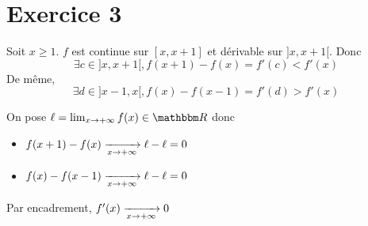 \part{Exercice 3}

Soit $x \ge 1$. $f$ est continue sur $[x, x+1]$ et dérivable sur $]x,x+1[$. Donc \[
	\exists c \in]x,x+1[, f(x+1)-f(x) = f'(c) < f'(x)
\] 
De même, \[
	\exists d \in ]x-1,x[, f(x) - f(x-1) = f'(d) > f'(x)
\] 

On pose $\ell = \lim_{x\to +\infty} f(x) \in \R$ donc 
\begin{itemize}
	\item $f(x+1)-f(x) \xrightarrow[x\to +\infty]{} \ell - \ell = 0$
	\item $f(x)-f(x-1) \xrightarrow[x\to +\infty]{} \ell - \ell = 0$
\end{itemize}

Par encadrement, $f'(x) \xrightarrow[x\to +\infty]{} 0$
